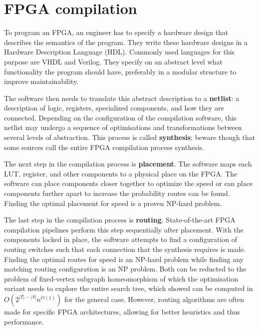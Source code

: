 \section{FPGA compilation}
\label{sec:compilation}
To program an FPGA, an engineer has to specify a hardware design that describes the semantics of the program. They write these hardware designs in a Hardware Description Language (HDL). Commonly used languages for this purpose are VHDL and Verilog. They specify on an abstract level what functionality the program should have, preferably in a modular structure to improve maintainability.

The software then needs to translate this abstract description to a \textbf{netlist}: a description of logic, registers, specialized components, and how they are connected. Depending on the configuration of the compilation software, this netlist may undergo a sequence of optimisations and transformations between several levels of abstraction. This process is called \textbf{synthesis}; beware though that some sources call the entire FPGA compilation process synthesis.

The next step in the compilation process is \textbf{placement}. The software maps each LUT, register, and other components to a physical place on the FPGA. The software can place components closer together to optimize the speed or can place components further apart to increase the probability routes can be found. Finding the optimal placement for speed is a proven NP-hard problem.

The last step in the compilation process is \textbf{routing}. State-of-the-art FPGA compilation pipelines perform this step sequentially after placement\cite{alhyari2019}. With the components locked in place, the software attempts to find a configuration of routing switches such that each connection that the synthesis requires is made. Finding the optimal routes for speed is an NP-hard problem while finding any matching routing configuration is an NP problem. Both can be reducted to the problem of fixed-vertex subgraph homeomorphism of which the optimisation variant needs to explore the entire search tree, which \cite{ExactComplexity} showed can be computed in $O(2^{|T|-|S|}n^{O(1)})$ for the general case. However, routing algorithms are often made for specific FPGA architectures, allowing for better heuristics and thus performance.

